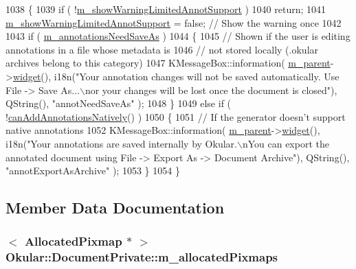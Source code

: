 \begin{DoxyCode}
1038 \{
1039     \textcolor{keywordflow}{if} ( !\hyperlink{classOkular_1_1DocumentPrivate_a1d12aaa9b1f2726a8e19b416587062c9}{m\_showWarningLimitedAnnotSupport} )
1040         \textcolor{keywordflow}{return};
1041     \hyperlink{classOkular_1_1DocumentPrivate_a1d12aaa9b1f2726a8e19b416587062c9}{m\_showWarningLimitedAnnotSupport} = \textcolor{keyword}{false}; \textcolor{comment}{// Show the warning once}
1042 
1043     \textcolor{keywordflow}{if} ( \hyperlink{classOkular_1_1DocumentPrivate_a44f722aa34fee888929abd92fe54ad82}{m\_annotationsNeedSaveAs} )
1044     \{
1045         \textcolor{comment}{// Shown if the user is editing annotations in a file whose metadata is}
1046         \textcolor{comment}{// not stored locally (.okular archives belong to this category)}
1047         KMessageBox::information( \hyperlink{classOkular_1_1DocumentPrivate_ac921eda41c014869ffec96ecc569c713}{m\_parent}->\hyperlink{classOkular_1_1Document_aef26598eca4c2fe772cc77d7730a9e8b}{widget}(), i18n(\textcolor{stringliteral}{"Your annotation changes will not
       be saved automatically. Use File -> Save As...\(\backslash\)nor your changes will be lost once the document is closed"}), 
      QString(), \textcolor{stringliteral}{"annotNeedSaveAs"} );
1048     \}
1049     \textcolor{keywordflow}{else} \textcolor{keywordflow}{if} ( !\hyperlink{classOkular_1_1DocumentPrivate_ac0e0b9633df5fbd632e9ffa865b0f04b}{canAddAnnotationsNatively}() )
1050     \{
1051         \textcolor{comment}{// If the generator doesn't support native annotations}
1052         KMessageBox::information( \hyperlink{classOkular_1_1DocumentPrivate_ac921eda41c014869ffec96ecc569c713}{m\_parent}->\hyperlink{classOkular_1_1Document_aef26598eca4c2fe772cc77d7730a9e8b}{widget}(), i18n(\textcolor{stringliteral}{"Your annotations are saved
       internally by Okular.\(\backslash\)nYou can export the annotated document using File -> Export As -> Document Archive"}), 
      QString(), \textcolor{stringliteral}{"annotExportAsArchive"} );
1053     \}
1054 \}
\end{DoxyCode}


\subsection{Member Data Documentation}
\hypertarget{classOkular_1_1DocumentPrivate_a13e55dcfc91cfbe1ff91a55312f3e39f}{
\subsubsection[{m\+\_\+allocated\+Pixmaps}]{$<$ {\bf Allocated\+Pixmap} $\ast$ $>$ Okular\+::\+Document\+Private\+::m\+\_\+allocated\+Pixmaps}}\label{classOkular_1_1DocumentPrivate_a13e55dcfc91cfbe1ff91a55312f3e39f}



